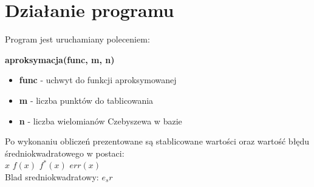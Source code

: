 \documentclass[]{article}
\begin{document}
\section{Działanie programu}

Program jest uruchamiany poleceniem:
\begin{center}
	\textbf{aproksymacja(func, m, n)}
\end{center} 
\begin{itemize}
	\item \textbf{func} - uchwyt do funkcji aproksymowanej
	\item \textbf{m} - liczba punktów do tablicowania
	\item \textbf{n} - liczba wielomianów Czebyszewa w bazie
\end{itemize}
Po wykonaniu obliczeń prezentowane są stablicowane wartości oraz wartość błędu średniokwadratowego w postaci:\\
$x$ \hspace{5mm} $f(x)$ \hspace{5mm} $f^*(x)$ \hspace{5mm} $err(x)$\\
Blad sredniokwadratowy: $e_sr$ \newpage
\end{document}
